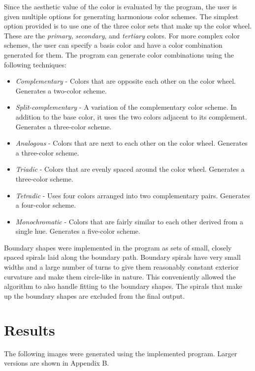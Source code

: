 \documentclass[11pt]{IEEEtran}
\begin{document}
Since the aesthetic value of the color is evaluated by the program, the user is given multiple options for generating harmonious color schemes. The simplest option provided is to use one of the three color sets that make up the color wheel. These are the \textit{primary}, \textit{secondary}, and \textit{tertiary} colors. For more complex color schemes, the user can specify a basis color and have a color combination generated for them. The program can generate color combinations using the following techniques\cite{quiller2002}: 
\begin{itemize}
	\item \textit{Complementary} - Colors that are opposite each other on the color wheel. Generates a two-color scheme.
	\item \textit{Split-complementary} - A variation of the complementary color scheme. In addition to the base color, it uses the two colors adjacent to its complement. Generates a three-color scheme.
	\item \textit{Analogous} - Colors that are next to each other on the color wheel. Generates a three-color scheme.
	\item \textit{Triadic} - Colors that are evenly spaced around the color wheel. Generates a three-color scheme.
	\item \textit{Tetradic} - Uses four colors arranged into two complementary pairs. Generates a four-color scheme.
	\item \textit{Monochromatic} - Colors that are fairly similar to each other derived from a single hue. Generates a five-color scheme.
\end{itemize}

Boundary shapes were implemented in the program as sets of small, closely spaced spirals laid along the boundary path. Boundary spirals have very small widths and a large number of turns to give them reasonably constant exterior curvature and make them circle-like in nature. This conveniently allowed the algorithm to also handle fitting to the boundary shapes. The spirals that make up the boundary shapes are excluded from the final output.

\section{Results}
The following images were generated using the implemented program. Larger versions are shown in Appendix B. 
\end{document}
